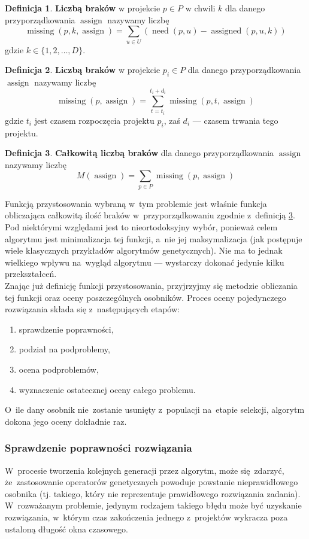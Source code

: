 \documentclass[12pt,a4paper]{article}
\theoremstyle{definition}
\newtheorem{defn}{Definicja}
\DeclareMathOperator{\need}{need}
\DeclareMathOperator{\assign}{assign}
\DeclareMathOperator{\assigned}{assigned}
\DeclareMathOperator{\missing}{missing}
\begin{document}
\begin{defn}
\textbf{Liczbą braków} w projekcie $p \in P$ w chwili $k$ dla danego przyporządkowania $\assign$
nazywamy liczbę
$$ \missing(p,k,\assign) = \sum_{u \in U} \left( \need(p,u) - 
\assigned(p, u, k)\right) $$
gdzie $k \in \{1, 2, \dots, D\}$.
\end{defn}

\begin{defn}
\textbf{Liczbą braków} w projekcie $p_i \in P$ dla danego przyporządkowania $\assign$
nazywamy liczbę
$$ \missing(p,\assign) = \sum_{t=t_i}^{t_i+d_i} \missing(p,t,\assign) $$
gdzie $t_i$ jest czasem rozpoczęcia projektu $p_i$, zaś $d_i$ --- czasem trwania tego projektu.
\end{defn}

\begin{defn}
\label{defn:totalmissingtime}
\textbf{Całkowitą liczbą braków} dla danego przyporządkowania $\assign$ nazywamy
liczbę
$$ M(\assign) = \sum_{p \in P} \missing(p, \assign) $$
\end{defn}
\noindent
Funkcją przystosowania wybraną w~tym problemie jest właśnie funkcja obliczająca całkowitą ilość braków w~przyporządkowaniu zgodnie z~definicją \ref{defn:totalmissingtime}.
Pod niektórymi względami jest to nieortodoksyjny wybór, ponieważ celem algorytmu jest minimalizacja tej funkcji, a~nie jej maksymalizacja (jak postępuje wiele klasycznych przykładów algorytmów genetycznych).
Nie ma to jednak wielkiego wpływu na~wygląd algorytmu --- wystarczy dokonać jedynie kilku przekształceń. \\

\noindent
Znając już definicję funkcji przystosowania, przyjrzyjmy się metodzie obliczania tej funkcji oraz oceny poszczególnych osobników.
Proces oceny pojedynczego rozwiązania składa się z~następujących etapów:
\begin{enumerate}
	\item sprawdzenie poprawności,
	\item podział na podproblemy,
	\item ocena podproblemów,
	\item wyznaczenie ostatecznej oceny całego problemu.
\end{enumerate}
O~ile dany osobnik nie~zostanie usunięty z~populacji na~etapie selekcji, algorytm dokona jego oceny dokładnie raz.

\subsubsection*{Sprawdzenie poprawności rozwiązania}
W~procesie tworzenia kolejnych generacji przez algorytm, może się~zdarzyć, że~zastosowanie operatorów genetycznych powoduje powstanie nieprawidłowego osobnika (tj. takiego, który nie reprezentuje prawidłowego rozwiązania zadania). 
W~rozważanym problemie, jedynym rodzajem takiego błędu może być uzyskanie rozwiązania, w~którym czas zakończenia jednego z~projektów wykracza poza ustaloną długość okna czasowego.\\
\end{document}
